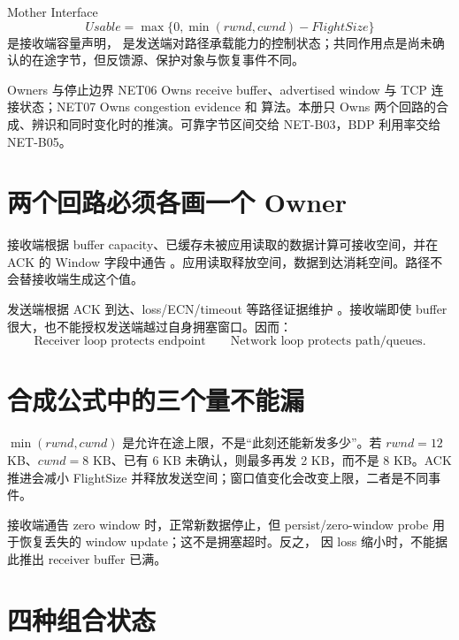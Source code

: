 \documentclass[UTF8,fontset=none,11pt,a4paper]{ctexart}
\begin{document}

\begin{corebox}{Mother Interface}
\[
\boxed{Usable=\max\{0,\min(rwnd,cwnd)-FlightSize\}}
\]
 是接收端容量声明， 是发送端对路径承载能力的控制状态；共同作用点是尚未确认的在途字节，但反馈源、保护对象与恢复事件不同。
\end{corebox}

\begin{methodbox}{Owners 与停止边界}
NET06 Owns receive buffer、advertised window 与 TCP 连接状态；NET07 Owns congestion evidence 和  算法。本册只 Owns 两个回路的合成、辨识和同时变化时的推演。可靠字节区间交给 NET-B03，BDP 利用率交给 NET-B05。
\end{methodbox}

\section{两个回路必须各画一个 Owner}

接收端根据 buffer capacity、已缓存未被应用读取的数据计算可接收空间，并在 ACK 的 Window 字段中通告 。应用读取释放空间，数据到达消耗空间。路径不会替接收端生成这个值。

发送端根据 ACK 到达、loss/ECN/timeout 等路径证据维护 。接收端即使 buffer 很大，也不能授权发送端越过自身拥塞窗口。因而：
\[
\boxed{\text{Receiver loop protects endpoint}}
\qquad
\boxed{\text{Network loop protects path/queues}}.
\]

\section{合成公式中的三个量不能漏}

$\min(rwnd,cwnd)$ 是允许在途上限，不是“此刻还能新发多少”。若 $rwnd=12$ KB、$cwnd=8$ KB、已有 6 KB 未确认，则最多再发 2 KB，而不是 8 KB。ACK 推进会减小 FlightSize 并释放发送空间；窗口值变化会改变上限，二者是不同事件。

接收端通告 zero window 时，正常新数据停止，但 persist/zero-window probe 用于恢复丢失的 window update；这不是拥塞超时。反之， 因 loss 缩小时，不能据此推出 receiver buffer 已满。

\section{四种组合状态}
\end{document}

